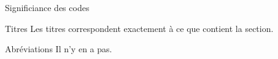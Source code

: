 \begin{frame}{Significiance des codes}
  \begin{block}{Titres}
    Les titres correspondent exactement à ce que contient la section.
  \end{block}

  \begin{block}{Abréviations}
    Il n'y en a pas.
  \end{block}
\end{frame}
